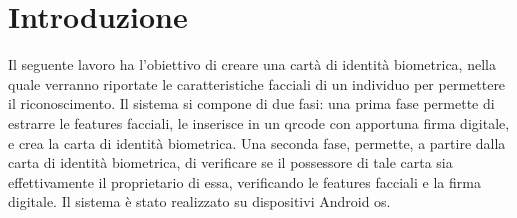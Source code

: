 \section{Introduzione}
Il seguente lavoro ha l'obiettivo di creare una cartà di identità biometrica, nella quale verranno riportate le caratteristiche facciali di un individuo per permettere il riconoscimento.
Il sistema si compone di due fasi: una prima fase permette di estrarre le features facciali, le inserisce in un qrcode con apportuna firma digitale, e crea la carta di identità biometrica. Una seconda fase, permette, a partire dalla carta di identità biometrica, di verificare se il possessore di tale carta sia effettivamente il proprietario di essa, verificando le features facciali e la firma digitale.
Il sistema è stato realizzato su dispositivi Android os.
